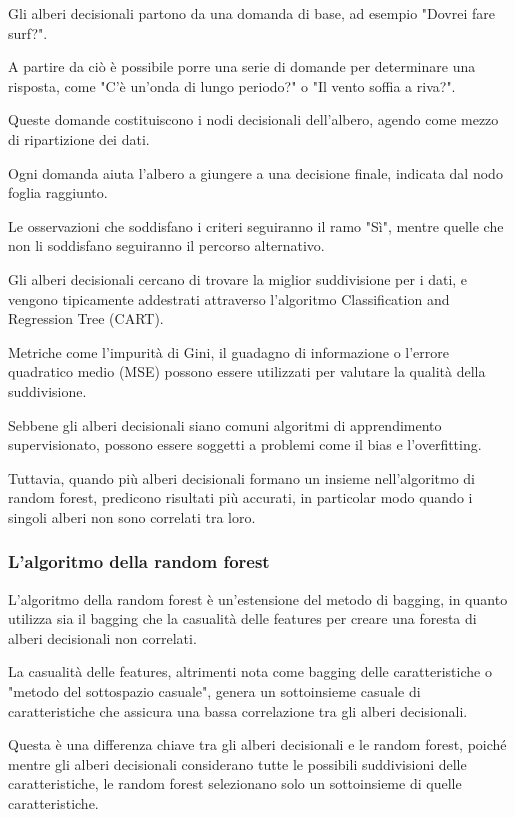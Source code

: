 Gli alberi decisionali partono da una domanda di base, ad esempio "Dovrei fare surf?". 

A partire da ciò è possibile porre una serie di domande per determinare una risposta, come "C'è un'onda di lungo periodo?" o "Il vento soffia a riva?". 

Queste domande costituiscono i nodi decisionali dell'albero, agendo come mezzo di ripartizione dei dati.

Ogni domanda aiuta l’albero a giungere a una decisione finale, indicata dal nodo foglia raggiunto. 

Le osservazioni che soddisfano i criteri seguiranno il ramo "Sì", mentre quelle che non li soddisfano seguiranno il percorso alternativo. 

Gli alberi decisionali cercano di trovare la miglior suddivisione per i dati, e vengono tipicamente addestrati attraverso l'algoritmo Classification and Regression Tree (CART). 

Metriche come l'impurità di Gini, il guadagno di informazione o l'errore quadratico medio (MSE) possono essere utilizzati per valutare la qualità della suddivisione.

Sebbene gli alberi decisionali siano comuni algoritmi di apprendimento supervisionato, possono essere soggetti a problemi come il bias e l'overfitting. 

Tuttavia, quando più alberi decisionali formano un insieme nell'algoritmo di random forest, predicono risultati più accurati, in particolar modo quando i singoli alberi non sono correlati tra loro.

\subsubsection{L'algoritmo della random forest}
L'algoritmo della random forest è un'estensione del metodo di bagging, in quanto utilizza sia il bagging che la casualità delle features per creare una foresta di alberi decisionali non correlati. 

La casualità delle features, altrimenti nota come bagging delle caratteristiche o "metodo del sottospazio casuale", genera un sottoinsieme casuale di caratteristiche che assicura una bassa correlazione tra gli alberi decisionali. 

Questa è una differenza chiave tra gli alberi decisionali e le random forest, poiché mentre gli alberi decisionali considerano tutte le possibili suddivisioni delle caratteristiche, le random forest selezionano solo un sottoinsieme di quelle caratteristiche.

